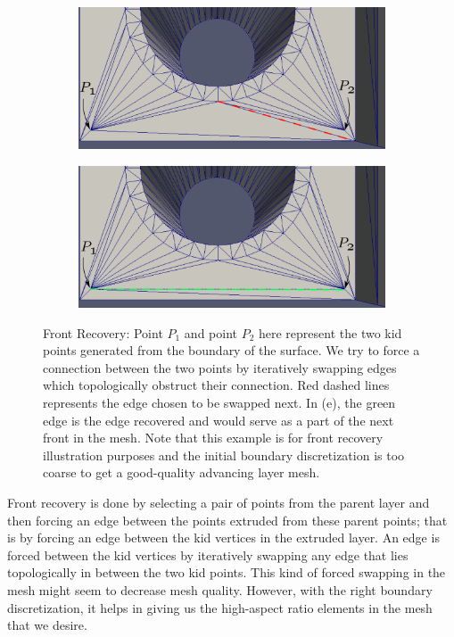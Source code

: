 \begin{figure}[hbt!]
\begin{subfigure}{.5\textwidth}
  \centering
  \includegraphics[width=.9\linewidth]{img/m1/force-swapping-edge-recovery/swap3-edited.eps}
  \caption{}
  \label{force-swap4}
\end{subfigure}
\begin{subfigure}{.5\textwidth}
  \centering
  \includegraphics[width=.9\linewidth]{img/m1/force-swapping-edge-recovery/swap4-edited.eps}
  \caption{}
  \label{force-swap5}
\end{subfigure}
\caption{Front Recovery: Point $P_1$ and point $P_2$ here represent the two kid points generated from the boundary of the surface. We try to force a connection between the two points by iteratively swapping edges which topologically obstruct their connection. Red dashed lines represents the edge chosen to be swapped next. In (e), the green edge is the edge recovered and would serve as a part of the next front in the mesh. Note that this example is for front recovery illustration purposes and the initial boundary discretization is too coarse to get a good-quality advancing layer mesh.}
\label{force-swap}
\end{figure}

Front recovery is done by selecting a pair of points from the parent layer and then forcing an edge between the points extruded from these parent points; that is by forcing an edge between the kid vertices in the extruded layer. An edge is forced between the kid vertices by iteratively swapping any edge that lies topologically in between the two kid points. This kind of forced swapping in the mesh might seem to decrease mesh quality. However, with the right boundary discretization, it helps in giving us the high-aspect ratio elements in the mesh that we desire.


